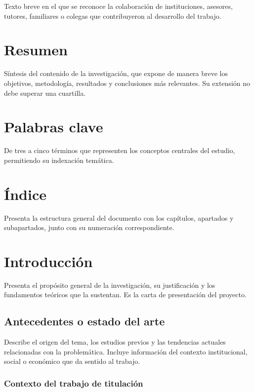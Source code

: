 Texto breve en el que se reconoce la colaboración de instituciones, asesores, tutores, familiares o colegas que contribuyeron al desarrollo del trabajo.

\section*{Resumen}

Síntesis del contenido de la investigación, que expone de manera breve los objetivos, metodología, resultados y conclusiones más relevantes. Su extensión no debe superar una cuartilla.

\section*{Palabras clave}

De tres a cinco términos que representen los conceptos centrales del estudio, permitiendo su indexación temática.

\section*{Índice}

Presenta la estructura general del documento con los capítulos, apartados y subapartados, junto con su numeración correspondiente.

\clearpage\section{Introducción}

Presenta el propósito general de la investigación, su justificación y los fundamentos teóricos que la sustentan. Es la carta de presentación del proyecto.

\subsection{Antecedentes o estado del arte}

Describe el origen del tema, los estudios previos y las tendencias actuales relacionadas con la problemática. Incluye información del contexto institucional, social o económico que da sentido al trabajo.

\subsubsection{Contexto del trabajo de titulación}

